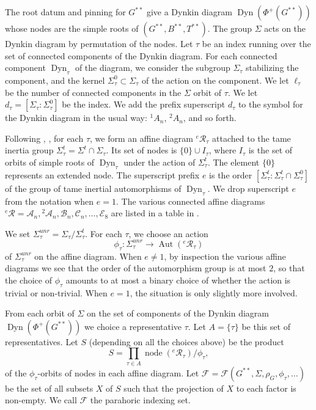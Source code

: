\documentclass[12pt]{amsart}
\newcommand{\op}[1]{\operatorname{#1}}
\newcommand{\cal}[1]{\mathcal{#1}}
\def\R{\cal{R}}
\newcommand{\cF}{\mathcal{F}}
\theoremstyle{plain}
\theoremstyle{definition}
\begin{document}
The root datum and pinning for $G^{**}$ give a Dynkin diagram
$\op{Dyn}(\Phi^+(G^{**}))$ whose nodes are the simple roots of
$(G^{**},B^{**},T^{**})$.  The group $\Sigma$ acts on the Dynkin
diagram by permutation of the nodes.  Let $\tau$ be an index running
over the set of connected components of the Dynkin diagram.  For each
connected component $\op{Dyn}_\tau$ of the diagram, we consider the
subgroup $\Sigma_\tau$ stabilizing the component, and the kernel
$\Sigma^0_\tau\subset \Sigma_\tau$ of the action on the component.
We let $\ell_\tau$ be the number of connected components in the
$\Sigma$ orbit of $\tau$.  We let $d_\tau =
[\Sigma_\tau:\Sigma_\tau^0]$ be the index.  We add the prefix
superscript $d_\tau$ to the symbol for the Dynkin diagram in the
usual way: ${}^1A_n$, ${}^2A_n$, and so forth.

Following \cite{Reeder}, \cite{Gross}, for each $\tau$, we form an
affine diagram ${}^e\R_\tau$ attached to the tame inertia group
$\Sigma^t_\tau = \Sigma^t\cap \Sigma_\tau$.  Its set of nodes is
$\{0\}\cup I_\tau$, where $I_\tau$ is the set of orbits of simple roots of
$\op{Dyn}_\tau$ under the action of $\Sigma^t_\tau$.  The element
$\{0\}$ represents an extended node.  The superscript prefix $e$ is
the order $[\Sigma^t_\tau:\Sigma^t_\tau\cap \Sigma_\tau^0]$ of
the group of tame inertial automorphisms of $\op{Dyn}_\tau$.  We
drop superscript $e$ from the notation when $e=1$.  The various
connected affine diagrams ${}^e\R = \cal{A}_n, {}^2\cal{A}_n,
\cal{B}_n, \cal{C}_n,\ldots, \cal{E}_8$ are listed in a table in
\cite{Gross}.

We set $\Sigma^{unr}_\tau = \Sigma_\tau/\Sigma^t_\tau$.
For each $\tau$, we choose an action
\[
\phi_\tau:\Sigma^{unr}_\tau\to \op{Aut}({}^e\R_\tau)
\]
of $\Sigma^{unr}_\tau$ on the affine diagram.  When $e\ne 1$, by
inspection the various affine diagrams we see that the order of the
automorphism group is at most $2$, so that the choice of $\phi_\tau$
amounts to at most a binary choice of whether the action is trivial or
non-trivial.  When $e=1$, the situation is only slightly more
involved.

From each orbit of $\Sigma$ on the set of components of the Dynkin
diagram $\op{Dyn}(\Phi^+(G^{**}))$ we choice a representative
$\tau$.  Let $A = \{\tau\}$ be this set of representatives.  Let
$S$ (depending on all the choices above) be the product
\[
S = \prod_{\tau\in A} \op{node}({}^e\R_\tau)/\phi_\tau,
\]
of the $\phi_\tau$-orbits of nodes in each affine diagram.  Let $\cF
= \cF(G^{**},\Sigma,\rho_G,\phi_\tau,\ldots)$ be the set of all
subsets $X$ of $S$ such that the projection of $X$ to each factor is
non-empty.  We call $\cF$ the parahoric indexing set.
\end{document}
